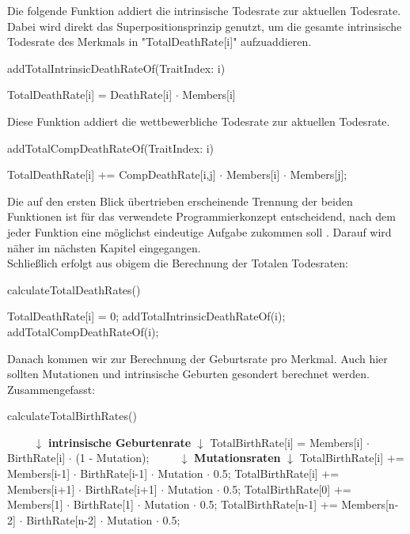\documentclass[11pt, a4paper, german]{article}
\theoremstyle{plain}
\begin{document}
	Die folgende Funktion addiert die intrinsische Todesrate zur aktuellen Todesrate. Dabei wird direkt das Superpositionsprinzip genutzt, um die gesamte intrinsische Todesrate des Merkmals in "{}TotalDeathRate[i]"{} aufzuaddieren.
	\begin{algorithm}[H]
		\caption{addTotalIntrinsicDeathRateOf(TraitIndex: i)}
		\begin{algorithmic}[1]
			\State TotalDeathRate[i] = DeathRate[i] $ \cdot $ Members[i]
		\end{algorithmic}
	\end{algorithm}
	Diese Funktion addiert die wettbewerbliche Todesrate zur aktuellen Todesrate.
	\begin{algorithm}[H]
		\caption{addTotalCompDeathRateOf(TraitIndex: i)}
		\begin{algorithmic}[1]
				\State TotalDeathRate[i] += CompDeathRate[i,j] $ \cdot $ Members[i] $ \cdot $ Members[j];
			\EndFor
		\end{algorithmic}
	\end{algorithm}
	Die auf den ersten Blick übertrieben erscheinende Trennung der beiden Funktionen ist für das verwendete Programmierkonzept entscheidend, nach dem jeder Funktion eine möglichst eindeutige Aufgabe zukommen soll \cite{martin2008clean}. Darauf wird näher im nächsten Kapitel eingegangen. \\
	Schließlich erfolgt aus obigem die Berechnung der Totalen Todesraten:
	\begin{algorithm}[H]
		\caption{calculateTotalDeathRates()}
		\begin{algorithmic}[1]
				\State TotalDeathRate[i] = 0;
				\State addTotalIntrinsicDeathRateOf(i);
				\State addTotalCompDeathRateOf(i);
			\EndFor
		\end{algorithmic}
	\end{algorithm}
	Danach kommen wir zur Berechnung der Geburtsrate pro Merkmal. Auch hier sollten Mutationen und intrinsische Geburten gesondert berechnet werden. Zusammengefasst:
	\begin{algorithm}[H]
		\caption{calculateTotalBirthRates()}
		\begin{algorithmic}[1]
			\State $ \qquad $ $ \downarrow $ \textbf{intrinsische Geburtenrate} $ \downarrow $
				\State TotalBirthRate[i] = Members[i] $ \cdot $ BirthRate[i] $ \cdot $ (1 - Mutation);
			\EndFor
			\State $ \qquad $ $ \downarrow $ \textbf{Mutationsraten} $ \downarrow $
				\State TotalBirthRate[i] += Members[i-1] $ \cdot $ BirthRate[i-1] $ \cdot $ Mutation $ \cdot $ 0.5;
				\State TotalBirthRate[i] += Members[i+1] $ \cdot $ BirthRate[i+1] $ \cdot $ Mutation $ \cdot $ 0.5;
			\EndFor
			\State TotalBirthRate[0] += Members[1] $ \cdot $ BirthRate[1] $ \cdot $ Mutation $ \cdot $ 0.5;
			\State TotalBirthRate[n-1] += Members[n-2] $ \cdot $ BirthRate[n-2] $ \cdot $ Mutation $ \cdot $ 0.5;
		\end{algorithmic}
	\end{algorithm}
\end{document}
